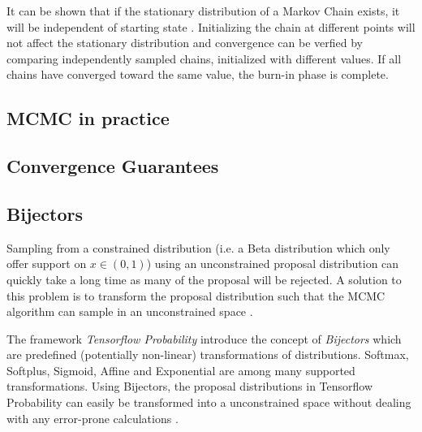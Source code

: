 It can be shown that if the stationary distribution of a Markov Chain exists, it will be independent of starting state \cite{murphy}. Initializing the chain at different points will not affect the stationary distribution and convergence can be verfied by comparing independently sampled chains, initialized with different values. If all chains have converged toward the same value, the burn-in phase is complete.    

\subsection{MCMC in practice}

\subsection{Convergence Guarantees}

\subsection{Bijectors}
Sampling from a constrained distribution (i.e. a Beta distribution which only offer support on $x \in (0, 1)$) using an unconstrained proposal distribution can quickly take a long time as many of the proposal will be rejected. A solution to this problem is to transform the proposal distribution such that the MCMC algorithm can sample in an unconstrained space \cite{Parno_2018, tensorflow2015-whitepaper}. 

The framework \textit{Tensorflow Probability} introduce the concept of \textit{Bijectors} which are predefined (potentially non-linear) transformations of distributions. Softmax, Softplus, Sigmoid, Affine and Exponential are among many supported transformations. Using Bijectors, the proposal distributions in Tensorflow Probability can easily be transformed into a unconstrained space without dealing with any error-prone calculations \cite{tensorflow2015-whitepaper}. 


